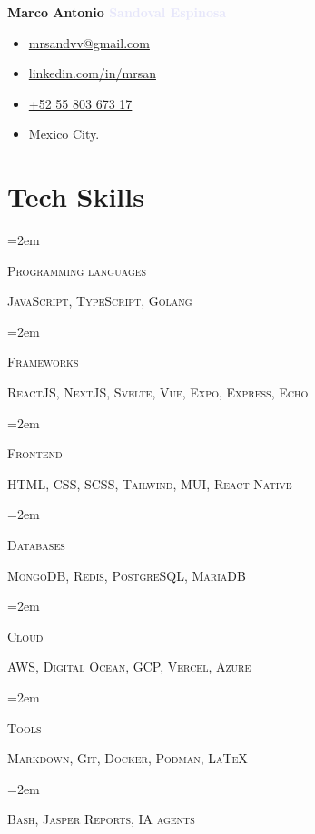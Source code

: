\documentclass[letterpaper]{article}
\newlength{\spacebox}
\newcommand{\skill}[2]{
\noindent\hangindent=2em\hangafter=0
\parbox{3\spacebox}{
\textsc{#1}}
#2 \par
\vspace{0.5em}
}
\begin{document}
\thispagestyle{empty}
\noindent
\textbf{\Huge \textcolor{darklavender}{Marco Antonio} \textcolor{lavender}{Sandoval Espinosa}}\par

\begin{flushleft}

\end{flushleft}\par

\noindent
\begin{itemize}[itemsep=0em]
\item[\faAt] \href{mailto:mrsandvv@gmail.com}{mrsandvv@gmail.com}
\item[\faLinkedin]\href{https://linkedin.com/in/mrsan}{linkedin.com/in/mrsan}
\item[\faPhone] \href{tel:+525580367317}{+52 55 803 673 17}
\item[\faMapMarker] \textcolor{darklavender}{Mexico City.}
\end{itemize}

\section*{Tech Skills}
\skill{Programming languages}{\textsc{JavaScript},  \textsc{TypeScript},  \textsc{Golang} }
\skill{Frameworks}{\textsc{ReactJS, NextJS, Svelte, Vue, Expo, Express, Echo}}
\skill{Frontend}{\textsc{HTML, CSS, SCSS, Tailwind, MUI, React Native}}
\skill{Databases}{\textsc{MongoDB, Redis, PostgreSQL, MariaDB}}
\skill{Cloud}{\textsc{AWS, Digital Ocean, GCP, Vercel, Azure}}
\skill{Tools}{\textsc{Markdown, Git, Docker, Podman, \LaTeX}}
\skill{ }{\textsc{Bash, Jasper Reports, IA agents}}
\end{document}
